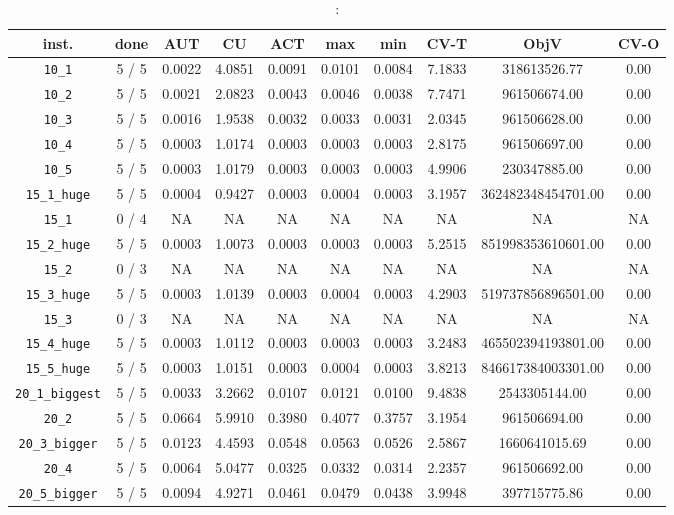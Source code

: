 \documentclass{scrartcl}
\begin{document}
\begin{table}[h!]
\begin{center}
\small
\begin{tabular}{| c | c | c | c | c | c | c | c | c | c |}
\hline
inst. & done & AUT & CU & ACT & max & min & CV-T & ObjV & CV-O \\
\hline
\verb|10_1| & 5 / 5 & 0.0022 & 4.0851 & 0.0091 & 0.0101 & 0.0084 & 7.1833 & 318613526.77 & 0.00\\ 
\verb|10_2| & 5 / 5 & 0.0021 & 2.0823 & 0.0043 & 0.0046 & 0.0038 & 7.7471 & 961506674.00 & 0.00\\ 
\verb|10_3| & 5 / 5 & 0.0016 & 1.9538 & 0.0032 & 0.0033 & 0.0031 & 2.0345 & 961506628.00 & 0.00\\ 
\verb|10_4| & 5 / 5 & 0.0003 & 1.0174 & 0.0003 & 0.0003 & 0.0003 & 2.8175 & 961506697.00 & 0.00\\ 
\verb|10_5| & 5 / 5 & 0.0003 & 1.0179 & 0.0003 & 0.0003 & 0.0003 & 4.9906 & 230347885.00 & 0.00\\ 
\verb|15_1_huge| & 5 / 5 & 0.0004 & 0.9427 & 0.0003 & 0.0004 & 0.0003 & 3.1957 & 362482348454701.00 & 0.00\\ 
\verb|15_1| & 0 / 4 & NA & NA & NA & NA & NA & NA & NA & NA\\ 
\verb|15_2_huge| & 5 / 5 & 0.0003 & 1.0073 & 0.0003 & 0.0003 & 0.0003 & 5.2515 & 851998353610601.00 & 0.00\\ 
\verb|15_2| & 0 / 3 & NA & NA & NA & NA & NA & NA & NA & NA\\ 
\verb|15_3_huge| & 5 / 5 & 0.0003 & 1.0139 & 0.0003 & 0.0004 & 0.0003 & 4.2903 & 519737856896501.00 & 0.00\\ 
\verb|15_3| & 0 / 3 & NA & NA & NA & NA & NA & NA & NA & NA\\ 
\verb|15_4_huge| & 5 / 5 & 0.0003 & 1.0112 & 0.0003 & 0.0003 & 0.0003 & 3.2483 & 465502394193801.00 & 0.00\\ 
\verb|15_5_huge| & 5 / 5 & 0.0003 & 1.0151 & 0.0003 & 0.0004 & 0.0003 & 3.8213 & 846617384003301.00 & 0.00\\ 
\verb|20_1_biggest| & 5 / 5 & 0.0033 & 3.2662 & 0.0107 & 0.0121 & 0.0100 & 9.4838 & 2543305144.00 & 0.00\\ 
\verb|20_2| & 5 / 5 & 0.0664 & 5.9910 & 0.3980 & 0.4077 & 0.3757 & 3.1954 & 961506694.00 & 0.00\\ 
\verb|20_3_bigger| & 5 / 5 & 0.0123 & 4.4593 & 0.0548 & 0.0563 & 0.0526 & 2.5867 & 1660641015.69 & 0.00\\ 
\verb|20_4| & 5 / 5 & 0.0064 & 5.0477 & 0.0325 & 0.0332 & 0.0314 & 2.2357 & 961506692.00 & 0.00\\ 
\verb|20_5_bigger| & 5 / 5 & 0.0094 & 4.9271 & 0.0461 & 0.0479 & 0.0438 & 3.9948 & 397715775.86 & 0.00\\  
\hline
\end{tabular}
\caption{:}
\label{table:}
\end{center}
\end{table}
\end{document}
